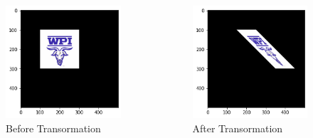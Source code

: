 \documentclass{beamer}
\theoremstyle{definition}
\theoremstyle{theorem}
\begin{document}
 \begin{frame}%
\begin{columns}
    \begin{column}{0.5\textwidth}
        \begin{figure}
  \includegraphics[width= 1\textwidth]{img1.png}
  \caption{Before  Transormation}
  \label{fig:goat1}
\end{figure}    \end{column}
    \begin{column}{0.5\textwidth}
        \begin{figure}
  \includegraphics[width= 1\textwidth]{img2.png}
  \caption{After Transormation}
  \label{fig:goat2}
\end{figure}
    \end{column}
\end{columns}
\end{frame}
\end{document}
